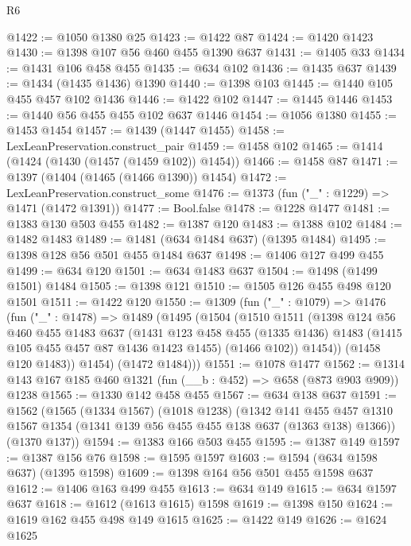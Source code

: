 \begin{lexlean}{R6}
\begin{coremodule}
@1422 := @1050 @1380 @25
@1423 := @1422 @87
@1424 := @1420 @1423
@1430 := @1398 @107 @56 @460 @455 @1390 @637
@1431 := @1405 @33
@1434 := @1431 @106 @458 @455
@1435 := @634 @102
@1436 := @1435 @637
@1439 := @1434 (@1435 @1436) @1390
@1440 := @1398 @103
@1445 := @1440 @105 @455 @457 @102 @1436
@1446 := @1422 @102
@1447 := @1445 @1446
@1453 := @1440 @56 @455 @455 @102 @637 @1446
@1454 := @1056 @1380
@1455 := @1453 @1454
@1457 := @1439 (@1447 @1455)
@1458 := LexLeanPreservation.construct_pair
@1459 := @1458 @102
@1465 := @1414 (@1424 (@1430 (@1457 (@1459 @102)) @1454))
@1466 := @1458 @87
@1471 := @1397 (@1404 (@1465 (@1466 @1390)) @1454)
@1472 := LexLeanPreservation.construct_some
@1476 := @1373 (fun ("_" : @1229) => @1471 (@1472 @1391))
@1477 := Bool.false
@1478 := @1228 @1477
@1481 := @1383 @130 @503 @455
@1482 := @1387 @120
@1483 := @1388 @102
@1484 := @1482 @1483
@1489 := @1481 (@634 @1484 @637) (@1395 @1484)
@1495 := @1398 @128 @56 @501 @455 @1484 @637
@1498 := @1406 @127 @499 @455
@1499 := @634 @120
@1501 := @634 @1483 @637
@1504 := @1498 (@1499 @1501) @1484
@1505 := @1398 @121
@1510 := @1505 @126 @455 @498 @120 @1501
@1511 := @1422 @120
@1550 := @1309
    (fun ("_" : @1079) =>
    @1476
      (fun ("_" : @1478) =>
      @1489
        (@1495
          (@1504
            (@1510
              @1511
              (@1398
                @124
                @56
                @460
                @455
                @1483
                @637
                (@1431
                  @123
                  @458
                  @455
                  (@1335 @1436)
                  @1483
                  (@1415 @105 @455 @457 @87 @1436 @1423 @1455)
                  (@1466 @102))
                @1454))
            (@1458 @120 @1483))
          @1454)
        (@1472 @1484)))
@1551 := @1078 @1477
@1562 := @1314 @143 @167 @185 @460 @1321 (fun (__b : @452) => @658 (@873 @903 @909)) @1238
@1565 := @1330 @142 @458 @455
@1567 := @634 @138 @637
@1591 := @1562
    (@1565
      (@1334 @1567)
      (@1018 @1238)
      (@1342
        @141
        @455
        @457
        @1310
        @1567
        @1354
        (@1341 @139 @56 @455 @455 @138 @637 (@1363 @138) @1366))
      (@1370 @137))
@1594 := @1383 @166 @503 @455
@1595 := @1387 @149
@1597 := @1387 @156 @76
@1598 := @1595 @1597
@1603 := @1594 (@634 @1598 @637) (@1395 @1598)
@1609 := @1398 @164 @56 @501 @455 @1598 @637
@1612 := @1406 @163 @499 @455
@1613 := @634 @149
@1615 := @634 @1597 @637
@1618 := @1612 (@1613 @1615) @1598
@1619 := @1398 @150
@1624 := @1619 @162 @455 @498 @149 @1615
@1625 := @1422 @149
@1626 := @1624 @1625

\end{coremodule}
\end{lexlean}
